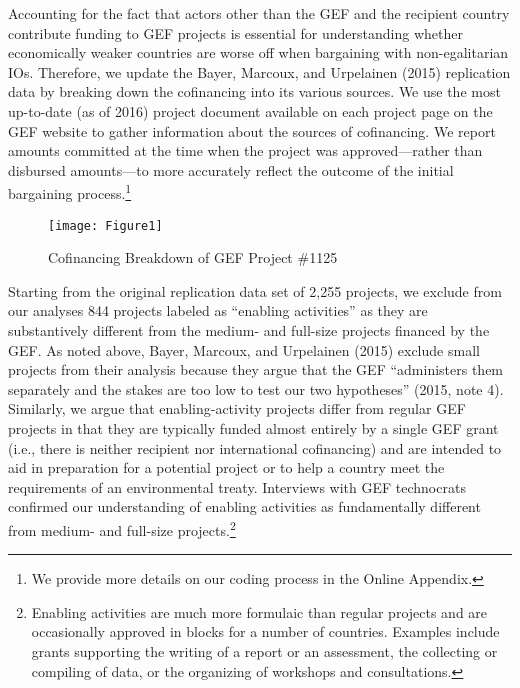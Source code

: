 \documentclass{article}
\begin{document}
Accounting for the fact that actors other than the GEF and the recipient country contribute funding to GEF projects is essential for understanding whether economically weaker countries are worse off when bargaining with non-egalitarian IOs.  Therefore, we update the Bayer, Marcoux, and Urpelainen (2015) replication data by breaking down the cofinancing into its various sources.  We use the most up-to-date (as of 2016) project document available on each project page on the GEF website to gather information about the sources of cofinancing.  We report amounts committed at the time when the project was approved---rather than disbursed amounts---to more accurately reflect the outcome of the initial bargaining process.\footnote{We provide more details on our coding process in the Online Appendix.}

\begin{figure}[H]
	\centering
	\caption{Cofinancing Breakdown of GEF Project \#1125}
	\texttt{[image: Figure1]}
	\label{fig:figure1}
\end{figure}
  
Starting from the original replication data set of 2,255 projects, we exclude from our analyses 844 projects labeled as “enabling activities” as they are substantively different from the medium- and full-size projects financed by the GEF.  As noted above, Bayer, Marcoux, and Urpelainen (2015) exclude small projects from their analysis because they argue that the GEF “administers them separately and the stakes are too low to test our two hypotheses” (2015, note 4).  Similarly, we argue that enabling-activity projects differ from regular GEF projects in that they are typically funded almost entirely by a single GEF grant (i.e., there is neither recipient nor international cofinancing) and are intended to aid in preparation for a potential project or to help a country meet the requirements of an environmental treaty.  Interviews with GEF technocrats confirmed our understanding of enabling activities as fundamentally different from medium- and full-size projects.\footnote{Enabling activities are much more formulaic than regular projects and are occasionally approved in blocks for a number of countries. Examples include grants supporting the writing of a report or an assessment, the collecting or compiling of data, or the organizing of workshops and consultations.}   
\end{document}
